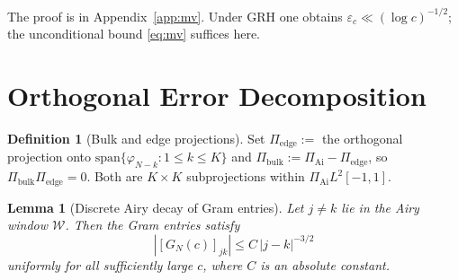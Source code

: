 \documentclass[12pt,a4paper]{amsart}
\newtheorem{lemma}[theorem]{Lemma}
\theoremstyle{definition}
\newtheorem{definition}[theorem]{Definition}
\newcommand{\PAi}{\Pi_{\mathrm{Ai}}}
\newcommand{\GN}{G_N(c)}
\newcommand{\Pbulk}{\Pi_{\mathrm{bulk}}}
\newcommand{\Pedge}{\Pi_{\mathrm{edge}}}
\begin{document}
The proof is in Appendix~\ref{app:mv}.
Under GRH one obtains $\varepsilon_c \ll (\log c)^{-1/2}$;
the unconditional bound \eqref{eq:mv} suffices here.

\section{Orthogonal Error Decomposition}
\label{sec:decomp}

\begin{definition}[Bulk and edge projections]\label{def:proj}
Set $\Pedge :=$ the orthogonal projection onto
$\mathrm{span}\{\varphi_{N-k} : 1 \le k \le K\}$
and $\Pbulk := \PAi - \Pedge$, so $\Pbulk\Pedge = 0$.
Both are $K\times K$ subprojections within $\PAi L^2[-1,1]$.
\end{definition}


\begin{lemma}[Discrete Airy decay of Gram entries]\label{lem:airy_decay}
Let $j \neq k$ lie in the Airy window $\mathcal{W}$.
Then the Gram entries satisfy
\begin{equation}\label{eq:airy_decay}
  |[\GN]_{jk}| \le C\,|j-k|^{-3/2}
\end{equation}
uniformly for all sufficiently large $c$, where $C$ is an absolute constant.
\end{lemma}
\end{document}
